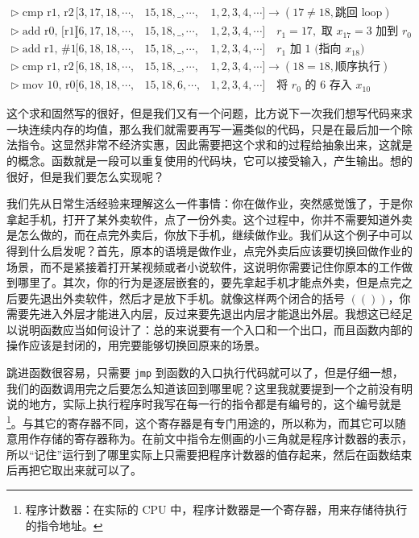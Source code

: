 \[\begin{array}{l|lll}
        \triangleright \; \text{cmp r1, r2}          & [3, 17, 18, \cdots,     & 15, 18, \_, \cdots,       & 1, 2, 3, 4, \cdots] \to (17 \neq 18, \text{跳回 loop})               \\
        \triangleright \; \text{add r0, [r1]}        & [6, 17, 18, \cdots,     & 15, 18, \_, \cdots,       & 1, 2, 3, 4, \cdots] \quad \text{$r_1 = 17,$ 取 $x_{17}=3$ 加到 $r_0$} \\
        \triangleright \; \text{add r1, \#1}         & [6, 18, 18, \cdots,     & 15, 18, \_, \cdots,       & 1, 2, 3, 4, \cdots] \quad \text{$r_1$ 加 1 (指向 $x_{18}$)}           \\
        \triangleright \; \text{cmp r1, r2}          & [6, 18, 18, \cdots,     & 15, 18, \_, \cdots,       & 1, 2, 3, 4, \cdots] \to (18 = 18, \text{顺序执行})                     \\
        \triangleright \; \text{mov 10, r0}          & [6, 18, 18, \cdots,     & 15, 18, 6, \cdots,        & 1, 2, 3, 4, \cdots] \quad \text{将 $r_0$ 的 6 存入 $x_{10}$}
    \end{array}
\]

这个求和固然写的很好，但是我们又有一个问题，比方说下一次我们想写代码来求一块连续内存的均值，那么我们就需要再写一遍类似的代码，只是在最后加一个除法指令。这显然非常不经济实惠，因此需要把这个求和的过程给抽象出来，这就是的概念。函数就是一段可以重复使用的代码块，它可以接受输入，产生输出。想的很好，但是我们要怎么实现呢？

我们先从日常生活经验来理解这么一件事情：你在做作业，突然感觉饿了，于是你拿起手机，打开了某外卖软件，点了一份外卖。这个过程中，你并不需要知道外卖是怎么做的，而在点完外卖后，你放下手机，继续做作业。我们从这个例子中可以得到什么启发呢？首先，原本的语境是做作业，点完外卖后应该要切换回做作业的场景，而不是紧接着打开某视频或者小说软件，这说明你需要记住你原本的工作做到哪里了。其次，你的行为是逐层嵌套的，要先拿起手机才能点外卖，但是点完之后要先退出外卖软件，然后才是放下手机。就像这样两个闭合的括号 $(())$，你需要先进入外层才能进入内层，反过来要先退出内层才能退出外层。我想这已经足以说明函数应当如何设计了：总的来说要有一个入口和一个出口，而且函数内部的操作应该是封闭的，用完要能够切换回原来的场景。

跳进函数很容易，只需要 \texttt{jmp} 到函数的入口执行代码就可以了，但是仔细一想，我们的函数调用完之后要怎么知道该回到哪里呢？这里我就要提到一个之前没有明说的地方，实际上执行程序时我写在每一行的指令都是有编号的，这个编号就是\footnote{程序计数器：在实际的 CPU 中，程序计数器是一个寄存器，用来存储待执行的指令地址。}。与其它的寄存器不同，这个寄存器是有专门用途的，所以称为，而其它可以随意用作存储的寄存器称为。在前文中指令左侧画的小三角就是程序计数器的表示，所以“记住”运行到了哪里实际上只需要把程序计数器的值存起来，然后在函数结束后再把它取出来就可以了。

